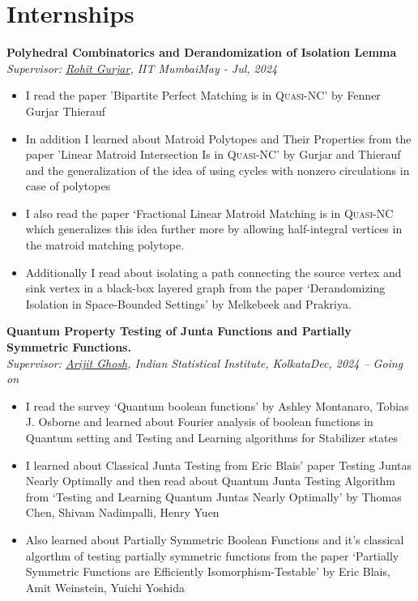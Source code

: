 \documentclass[letterpaper,10pt]{article}
\newcommand{\sbt}{\,\begin{picture}(-1,1)(-1,-3)\circle*{3}\end{picture}\ }
\newcommand{\heading}[2]{
  \hspace{10pt}#1\hfill#2\\
}
\newcommand{\headingBf}[2]{
  \heading{\textbf{#1}}{\textbf{#2}}
}
\newcommand{\headingIt}[2]{
  \heading{\textit{#1}}{\textit{#2}}
}
\newenvironment{resume_list}{
  \vspace{-7pt}
  \begin{itemize}[itemsep=-2px, parsep=1pt, leftmargin=30pt]
}{
  \end{itemize}
}
\begin{document}
\section{Internships}
\begin{resume_list}
	\item \headingBf{Polyhedral Combinatorics and Derandomization of Isolation Lemma}{}
	\headingIt{Supervisor: \href{https://www.cse.iitb.ac.in/~rgurjar/}{Rohit Gurjar}, IIT Mumbai}{May - Jul, 2024}
	\begin{itemize}[label=$\sbt$]
		\item I read the paper 'Bipartite Perfect Matching is in \textsc{Quasi-NC}' by Fenner Gurjar Thierauf
		\item In addition I learned about Matroid Polytopes and Their Properties from the paper 'Linear Matroid Intersection Is in \textsc{Quasi-NC}' by Gurjar and Thierauf and the generalization of the idea of using cycles with nonzero circulations in case of polytopes
		\item I also read the paper `Fractional Linear Matroid Matching is in \textsc{Quasi-NC} which generalizes this idea further more by allowing half-integral vertices in the matroid matching polytope.
		\item Additionally I read about isolating a path connecting the source vertex and sink vertex in a black-box layered graph from the paper `Derandomizing Isolation in Space-Bounded Settings' by Melkebeek and Prakriya.
	\end{itemize}

\item \headingBf{Quantum Property Testing of Junta Functions and Partially Symmetric Functions.}{}
\headingIt{Supervisor: \href{https://sites.google.com/site/homepagearijitghosh/}{Arijit Ghosh}, Indian Statistical Institute, Kolkata}{Dec, 2024 -- Going on}
\begin{itemize}
	\item I read the survey `Quantum boolean functions' by Ashley Montanaro, Tobias J. Osborne and learned  about Fourier analysis of boolean functions in Quantum setting and Testing and Learning algorithms for Stabilizer states
	\item I learned about Classical Junta Testing from Eric Blais' paper Testing Juntas Nearly Optimally and then read about Quantum Junta Testing Algorithm from `Testing and Learning Quantum Juntas Nearly Optimally' by Thomas Chen, Shivam Nadimpalli, Henry Yuen
	\item Also learned about Partially Symmetric Boolean Functions and it's classical algorthm of testing partially symmetric functions from the paper `Partially Symmetric Functions are Efficiently Isomorphism-Testable' by Eric Blais, Amit Weinstein, Yuichi Yoshida
\end{itemize}



\end{resume_list}
\end{document}
